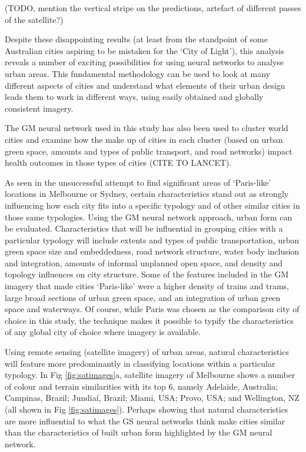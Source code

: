 \documentclass[10pt,letterpaper]{article}
\begin{document}
(TODO, mention the vertical stripe on the predictions, artefact of different passes of the satellite?)



Despite these disappointing results (at least from the standpoint of some Australian cities aspiring to be mistaken for the `City of Light'), this analysis reveals a number of exciting possibilities for using neural networks to analyse urban areas. This fundamental methodology can be used to look at many different aspects of cities and understand what elements of their urban design leads them to work in different ways, using easily obtained and globally consistent imagery. 

The GM neural network used in this study has also been used to cluster world cities and examine how the make up of cities in each cluster (based on urban green space, amounts and types of public transport, and road networks) impact health outcomes in those types of cities (CITE TO LANCET). 

As seen in the unsuccessful attempt to find significant areas of `Paris-like' locations in Melbourne or Sydney, certain characteristics stand out as strongly influencing how each city fits into a specific typology and of other similar cities in those same typologies. Using the GM neural network approach, urban form can be evaluated. Characteristics that will be influential in grouping cities with a particular typology will include extents and types of public transportation, urban green space size and embeddedness, road network structure, water body inclusion and integration, amounts of informal unplanned open space, and density and topology influences on city structure. Some of the features included in the GM imagery that made cities `Paris-like' were a higher density of trains and trams, large broad sections of urban green space, and an integration of urban green space and waterways. Of course, while Paris was chosen as the comparison city of choice in this study, the technique makes it possible to typify the characteristics of any global city of choice where imagery is available.


Using remote sensing (satellite imagery) of urban areas, natural characteristics will feature more predominantly in classifying locations within a particular typology. In Fig \ref{fig:satimages}a, satellite imagery of Melbourne shows a number of colour and terrain similarities with its top 6, namely Adelaide, Australia; Campinas, Brazil; Jundia\'{i}, Brazil; Miami, USA; Provo, USA; and Wellington, NZ (all shown in Fig \ref{fig:satimages}). Perhaps showing that natural characteristics are more influential to what the GS neural networks think make cities similar than the characteristics of built urban form highlighted by the GM neural network.
\end{document}
